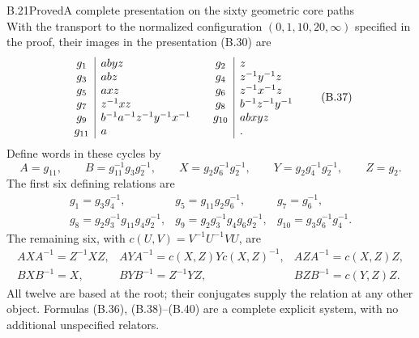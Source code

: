 \begin{result}{B.21}{Proved}{A complete presentation on the sixty geometric core paths}
\[\]
\endgroup
With the transport to the normalized configuration
$(0,1,10,20,\infty)$ specified in the proof, their images
in the presentation (B.30) are
\[
\begin{array}{c|l@{\qquad}c|l}
g_1&abyz&g_2&z\\
g_3&abz&g_4&z^{-1}y^{-1}z\\
g_5&axz&g_6&z^{-1}x^{-1}z\\
g_7&z^{-1}xz&g_8&b^{-1}z^{-1}y^{-1}\\
g_9&b^{-1}a^{-1}z^{-1}y^{-1}x^{-1}&g_{10}&abxyz\\
g_{11}&a&&.
\end{array}                                                    \tag{B.37}
\]
Define words in these cycles by
\[
 A=g_{11},\qquad B=g_{11}^{-1}g_3g_2^{-1},\qquad
 X=g_2g_6^{-1}g_2^{-1},\qquad
 Y=g_2g_4^{-1}g_2^{-1},\qquad Z=g_2.              \tag{B.38}
\]
The first six defining relations are
\[
\begin{array}{lll}
 g_1=g_3g_4^{-1},&g_5=g_{11}g_2g_6^{-1},&g_7=g_6^{-1},\\
 g_8=g_2g_3^{-1}g_{11}g_4g_2^{-1},&
 g_9=g_2g_3^{-1}g_4g_6g_2^{-1},&
 g_{10}=g_3g_6^{-1}g_4^{-1}.
\end{array}                                                    \tag{B.39}
\]
The remaining six, with $c(U,V)=V^{-1}U^{-1}VU$, are
\[
\begin{array}{lll}
 AXA^{-1}=Z^{-1}XZ,&
 AYA^{-1}=c(X,Z)Yc(X,Z)^{-1},&
 AZA^{-1}=c(X,Z)Z,\\
 BXB^{-1}=X,&
 BYB^{-1}=Z^{-1}YZ,&
 BZB^{-1}=c(Y,Z)Z.
\end{array}                                                    \tag{B.40}
\]
All twelve are based at the root; their conjugates supply
the relation at any other object.  Formulas (B.36),
(B.38)--(B.40) are a complete explicit system, with no
additional unspecified relators.
\end{result}
